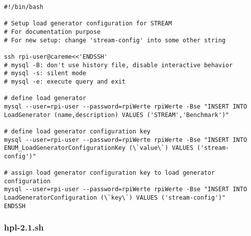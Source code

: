 \begin{verbatim}
#!/bin/bash 

# Setup load generator configuration for STREAM  
# For documentation purpose 
# For new setup: change 'stream-config' into some other string

ssh rpi-user@careme<<'ENDSSH'                                                                                                                                               
# mysql -B: don't use history file, disable interactive behavior                                                                                                           
# mysql -s: silent mode                                                                                                                                                                
# mysql -e: execute query and exit

# define load generator                                                                                                                                                    
mysql --user=rpi-user --password=rpiWerte rpiWerte -Bse "INSERT INTO 
LoadGenerator (name,description) VALUES ('STREAM','Benchmark')"                                    

# define load generator configuration key                                                                                                                                  
mysql --user=rpi-user --password=rpiWerte rpiWerte -Bse "INSERT INTO 
ENUM_LoadGeneratorConfigurationKey (\`value\`) VALUES ('stream-config')"                               

# assign load generator configuration key to load generator configuration                                                                                                  
mysql --user=rpi-user --password=rpiWerte rpiWerte -Bse "INSERT INTO 
LoadGeneratorConfiguration (\`key\`) VALUES ('stream-config')"                                            
ENDSSH
\end{verbatim}

\subsubsection{hpl-2.1.sh}

